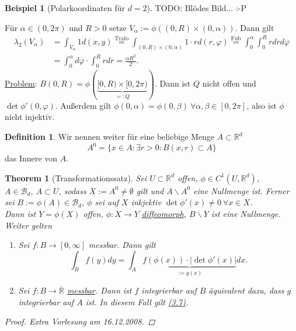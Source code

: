 \documentclass[a4paper]{scrreprt}
\newcommand{\R}{\mathbb{R}}
\newcommand{\Rq}{\overline{\R}}
\newcommand{\Borel}{\mathcal{B}}
\newcommand{\Bd}{\Borel_d}
\newcommand{\jlabel}[1]{\label{j_#1}}
\newcommand{\jhyperref}[2]{\hyperref[j_#1]{#2}}
\newcommand{\jlink}[1]{\jhyperref{#1}{#1}}
\newcommand{\jabb}[3]{ #1: #2 \rightarrow #3 }
\newcommand{\jshortlinkFubini}{\jhyperref{Fubini}{\text{Fub}}}
\newcommand{\jspace}{\vspace{8pt}}
\theoremstyle{plain}
\newtheorem{thm}{Theorem}[chapter]
\theoremstyle{definition}
\newtheorem*{defn*}{Definition}
\newtheorem*{expl*}{Beispiel}
\begin{document}
{{{{\begin{expl*}[Polarkoordinaten für $d=2$]
    \jspace
    
    TODO: Blödes Bild... :-P
    
    \jspace
    
    Für $\alpha \in (0, 2\pi)$ und $R>0$ setze $V_\alpha:= \phi((0,R)\times (0, \alpha))$. Dann gilt
    \begin{displaymath}
        \begin{split}
            \lambda_2(V_\alpha) &= \int_{V_\alpha} 1 d(x,y) \overset{\text{Trafo}}{=} \int_{(0,R)\times(0,\alpha)} 1\cdot r d(r,\varphi) \overset{\jshortlinkFubini}{=} \int_0^\alpha \int_0^R r dr d\varphi\\
            &= \int_0^\alpha d\varphi \cdot \int_0^R r dr = \frac{\alpha R^2}{2}.
        \end{split}
    \end{displaymath}
    \uline{Problem}: $B(0,R) = \phi(\underbrace{[0,R)\times [0,2\pi)}_{=: Q})$. Dann ist $Q$ nicht offen und $\det \phi'(0,\varphi)$. Außerdem gilt $\phi(0,\alpha) = \phi(0, \beta) \ \forall \alpha, \beta \in [0,2\pi]$, also ist $\phi$ nicht injektiv.
\end{expl*}

\begin{defn*}
    Wir nennen weiter für eine beliebige Menge $A\subset \R^d$ 
    \begin{displaymath}
        A^0 = \{x\in A : \exists r>0: B(x,r) \subset A\}
    \end{displaymath}
    das Innere von $A$.
\end{defn*}

\begin{thm}[Transformationssatz]
    \jlabel{Thm 3.30}
    \jlabel{Trafo}
    Sei $U\subset \R^d$ offen, $\phi \in C^1(U, \R^d)$, $A\in \Bd, \ A\subset U$, sodass $X:= A^0 \ne \emptyset$ gilt und $A\backslash A^0$ eine Nullmenge ist. Ferner sei $B:=\phi(A)\in \Bd$, $\phi$ sei auf $X$ inkjektiv $\det \phi'(x) \ne 0 \ \forall x\in X$.\\
    Dann ist $Y = \phi(X)$ offen, $\jabb{\phi}{X}{Y}$ \jlink{diffeomorph}, $B\backslash Y$ ist eine Nullmenge. Weiter gelten
    \begin{enumerate}
        \item
            Sei $\jabb{f}{B}{[0,\infty]}$ messbar. Dann gilt
            \begin{equation}
                \jlabel{(3.7)}
                \int_B f(y) dy = \int_A \underbrace{f(\phi(x))\cdot |\det \phi'(x)|}_{:= g(x)} dx.
            \end{equation}
        \item
            Sei $\jabb{f}{B}{\Rq}$ \jlink{messbar}. Dann ist $f$ integrierbar auf $B$ äquivalent dazu, dass $g$ integrierbar auf $A$ ist. In diesem Fall gilt \jlink{(3.7)}.
    \end{enumerate}
    \begin{proof}
        Extra Vorlesung am 16.12.2008.
    \end{proof}
\end{thm}

}}}}
\end{document}
